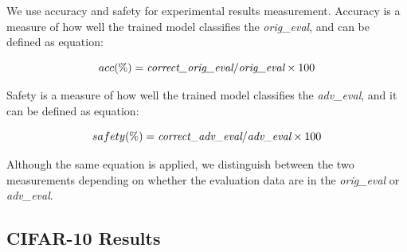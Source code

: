 \documentclass[journal,article,submit,moreauthors,pdftex]{Definitions/mdpi}
\begin{document}
We use accuracy and safety for experimental results measurement. Accuracy is a measure of how well the trained model classifies the {\it orig\_eval}, and can be defined as equation:

\begin{equation}
    acc(\%) = \text{{\it correct\_orig\_eval}} / \text{{\it orig\_eval}} \times 100
\end{equation} 

Safety is a measure of how well the trained model classifies the {\it adv\_eval}, and it can be defined as equation:

\begin{equation}
    safety(\%) = \text{{\it correct\_adv\_eval}} / \text{{\it adv\_eval}} \times 100
\end{equation}

Although the same equation is applied, we distinguish between the two measurements depending on whether the evaluation data are in the {\it orig\_eval} or {\it adv\_eval}.

\subsection{CIFAR-10 Results}
\end{document}
